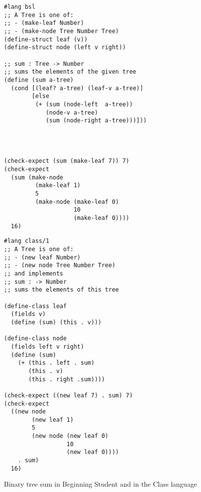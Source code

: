 \documentclass[submission,copyright]{eptcs}
\begin{document}


\begin{figure}[h!]
\begin{minipage}[t]{3.5in}
\begin{verbatim}
#lang bsl
;; A Tree is one of:
;; - (make-leaf Number)
;; - (make-node Tree Number Tree)
(define-struct leaf (v))
(define-struct node (left v right))

;; sum : Tree -> Number
;; sums the elements of the given tree
(define (sum a-tree)
  (cond [(leaf? a-tree) (leaf-v a-tree)]
        [else
         (+ (sum (node-left  a-tree))
            (node-v a-tree)
            (sum (node-right a-tree)))]))




(check-expect (sum (make-leaf 7)) 7)
(check-expect 
  (sum (make-node
         (make-leaf 1)
         5 
         (make-node (make-leaf 0)
                    10
                    (make-leaf 0))))
  16)
\end{verbatim}
\end{minipage}
\begin{minipage}[t]{3in}
\begin{verbatim}
#lang class/1
;; A Tree is one of:
;; - (new leaf Number)
;; - (new node Tree Number Tree)
;; and implements
;; sum : -> Number
;; sums the elements of this tree

(define-class leaf
  (fields v)
  (define (sum) (this . v)))

(define-class node
  (fields left v right)
  (define (sum)
    (+ (this . left . sum)
       (this . v)
       (this . right .sum))))

(check-expect ((new leaf 7) . sum) 7)
(check-expect 
  ((new node
        (new leaf 1)
        5 
        (new node (new leaf 0) 
                  10
                  (new leaf 0))))
    . sum)
  16)
\end{verbatim}
\end{minipage}
\caption{Binary tree sum in Beginning Student and in the Class language}
\label{fig:tree}
\end{figure}
\end{document}
